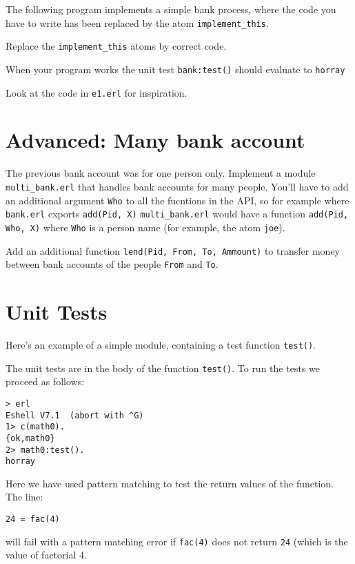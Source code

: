 \documentclass[12pt]{hitec}
\begin{document}
The following program implements a simple bank process, where the code
you have to write has been replaced by the atom \verb+implement_this+.

Replace the \verb+implement_this+ atoms by correct code. 


When your program works the unit test \verb+bank:test()+ should
evaluate to \verb+horray+

Look at the code in \verb+e1.erl+ for inspiration.

\section{Advanced: Many bank account}

The previous bank account was for one person only. Implement a module
\verb+multi_bank.erl+ that handles bank accounts for many
people. You'll have to add an additional argument \verb+Who+ to all
the fucntions in the API, so for example where \verb+bank.erl+ exports
\verb+add(Pid, X)+ \verb+multi_bank.erl+ would have a function
\verb+add(Pid, Who, X)+ where \verb+Who+ is a person name (for example, the
atom \verb+joe+).

Add an additional function \verb+lend(Pid, From, To, Ammount)+ to
transfer money between bank accounts of the people \verb+From+ and \verb+To+.

\section{Unit Tests}

Here's an example of a simple module, containing a test function \verb+test()+.


The unit tests are in the body of the function \verb+test()+. To run the tests
we proceed as follows:

\begin{verbatim}
> erl
Eshell V7.1  (abort with ^G)
1> c(math0).
{ok,math0}
2> math0:test().
horray
\end{verbatim}

Here we have used pattern matching to test the return values of the function.
The line:
\begin{verbatim}
24 = fac(4)
\end{verbatim}

will fail with a pattern matching error if \verb+fac(4)+ does not return  \verb+24+
(which is the value of factorial 4.
\end{document}

